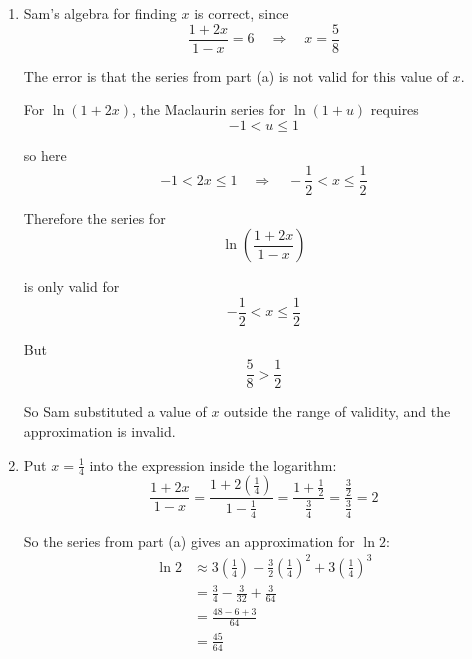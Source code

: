 \documentclass[leqno]{article}
\begin{document}
\begin{enumerate}[
  label=\textbf{\arabic*.},
  leftmargin=*,
  topsep=0pt,
  partopsep=0pt,
  parsep=0pt
]
\begin{djsSolution}
\begin{enumerate}[label=\textbf{(\alph*)}]
and the Maclaurin series
\[
\ln(1+u)=u-\frac{u^2}{2}+\frac{u^3}{3}+\cdots\qquad (-1<u\leq 1)
\]
\[
\ln(1-u)=-u-\frac{u^2}{2}-\frac{u^3}{3}-\cdots\qquad (-1\leq u<1)
\]

with $u=2x$, we have
\[
\ln(1+2x)=2x-\frac{(2x)^2}{2}+\frac{(2x)^3}{3}+\cdots
=2x-2x^2+\frac{8}{3}x^3+\cdots
\]

Also, with $u=x$:
\[
\ln(1-x)=-x-\frac12x^2-\frac13x^3+\cdots
\]

So
\begin{align*}
\ln\left(\frac{1+2x}{1-x}\right)
&=\left(2x-2x^2+\frac{8}{3}x^3+\cdots\right)-\left(-x-\frac12x^2-\frac13x^3+\cdots\right) \\
&=3x-\frac32x^2+3x^3+\cdots
\end{align*}

Hence the first three non-zero terms are
\[
3x-\frac32x^2+3x^3
\]

  \item Sam’s algebra for finding $x$ is correct, since
\[
\frac{1+2x}{1-x}=6\quad\Longrightarrow\quad x=\frac58
\]

The error is that the series from part (a) is not valid for this value of $x$.

For $\ln(1+2x)$, the Maclaurin series for $\ln(1+u)$ requires
\[
-1<u\leq 1
\]

so here
\[
-1<2x\leq 1\quad\Longrightarrow\quad -\frac12<x\leq \frac12
\]

Therefore the series for
\[
\ln\left(\frac{1+2x}{1-x}\right)
\]

is only valid for
\[
-\frac12<x\leq \frac12
\]

But
\[
\frac58>\frac12
\]

So Sam substituted a value of $x$ outside the range of validity, and the approximation is invalid.

  \item Put $x=\frac14$ into the expression inside the logarithm:
\[
\frac{1+2x}{1-x}
=\frac{1+2\left(\frac14\right)}{1-\frac14}
=\frac{1+\frac12}{\frac34}
=\frac{\frac32}{\frac34}
=2
\]

So the series from part (a) gives an approximation for $\ln 2$:
\begin{align*}
\ln 2
&\approx 3\left(\frac14\right)-\frac32\left(\frac14\right)^2+3\left(\frac14\right)^3 \\
&=\frac34-\frac{3}{32}+\frac{3}{64} \\
&=\frac{48-6+3}{64} \\
&=\frac{45}{64}
\end{align*}


\end{enumerate}
\end{djsSolution}
\end{enumerate}
\end{document}
